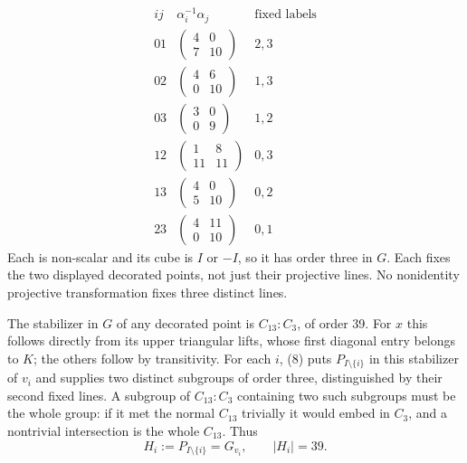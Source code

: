\documentclass[11pt,a4paper]{article}
\begin{document}
\[
\begin{array}{c|c|c}
ij&\alpha_i^{-1}\alpha_j&\text{fixed labels}\\\hline
01&\left(\begin{smallmatrix}4&0\\7&10\end{smallmatrix}\right)&2,3\\
02&\left(\begin{smallmatrix}4&6\\0&10\end{smallmatrix}\right)&1,3\\
03&\left(\begin{smallmatrix}3&0\\0&9\end{smallmatrix}\right)&1,2\\
12&\left(\begin{smallmatrix}1&8\\11&11\end{smallmatrix}\right)&0,3\\
13&\left(\begin{smallmatrix}4&0\\5&10\end{smallmatrix}\right)&0,2\\
23&\left(\begin{smallmatrix}4&11\\0&10\end{smallmatrix}\right)&0,1
\end{array}                                               \tag{8}
\]
Each is non-scalar and its cube is $I$ or $-I$, so it has order
three in $G$. Each fixes the two displayed decorated points,
not just their projective lines. No nonidentity projective
transformation fixes three distinct lines.

The stabilizer in $G$ of any decorated point is $C_{13}:C_3$,
of order 39. For $x$ this follows directly from its upper
triangular lifts, whose first diagonal entry belongs to $K$;
the others follow by transitivity. For each $i$, (8) puts
$P_{I\setminus\{i\}}$ in this stabilizer of $v_i$ and supplies
two distinct subgroups of order three, distinguished by their
second fixed lines. A subgroup of $C_{13}:C_3$ containing two
such subgroups must be the whole group: if it met the normal
$C_{13}$ trivially it would embed in $C_3$, and a nontrivial
intersection is the whole $C_{13}$. Thus
\[
             H_i:=P_{I\setminus\{i\}}=G_{v_i},
             \qquad |H_i|=39.                            \tag{9}
\]
\end{document}
